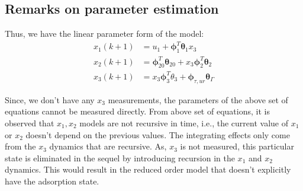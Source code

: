  \subsection{Remarks on parameter estimation}
 Thus, we have the linear parameter form of the model:
 \begin{align*}
     x_1(k+1) &= u_1 + \pmb \phi_1^T  \pmb \theta_1 x_3 \\
     x_2 (k+1) &= \pmb \phi_{20}^T \pmb \theta_{20} + x_3 \pmb \phi_2^T \pmb \theta_2\\
     x_3(k+1) &= x_3 \pmb \phi_3^T \theta_3 + \pmb \phi_{\tau, ur} \pmb \theta_\Gamma
 \end{align*}

 Since, we don't have any $x_3$ measurements, the parameters of the above set of equations cannot be measured directly. From above set of equations, it is observed that $x_1, x_2$ models are not recursive in time, i.e., the current value of $x_1$ or $x_2$ doesn't depend on the previous values. The integrating effects only come from the $x_3$ dynamics that are recursive. As, $x_3$ is not measured, this particular state is eliminated in the sequel by introducing recursion in the $x_1$ and $x_2$ dynamics. This would result in the reduced order model that doesn't explicitly have the adsorption state.
